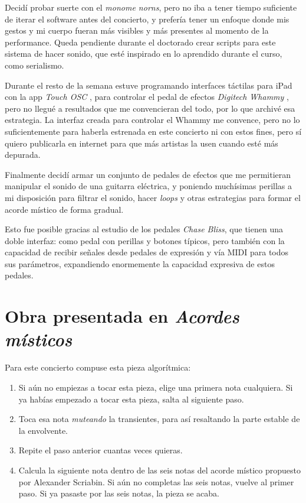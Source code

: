 \documentclass{article}
\begin{document}
Decidí probar suerte con el \textit{monome norns}, pero no iba a tener tiempo suficiente de iterar el software antes del concierto, y prefería tener un enfoque donde mis gestos y mi cuerpo fueran más visibles y más presentes al momento de la performance. Queda pendiente durante el doctorado crear scripts para este sistema de hacer sonido, que esté inspirado en lo aprendido durante el curso, como serialismo.

Durante el resto de la semana estuve programando interfaces táctilas para iPad con la app \textit{Touch OSC} \cite{hexlerTouchOSC}, para controlar el pedal de efectos \textit{Digitech Whammy} \cite{digitechWhammy}, pero no llegué a resultados que me convencieran del todo, por lo que archivé esa estrategia. La interfaz creada para controlar el Whammy me convence, pero no lo suficientemente para haberla estrenada en este concierto ni con estos fines, pero sí quiero publicarla en internet para que más artistas la usen cuando esté más depurada.

Finalmente decidí armar un conjunto de pedales de efectos que me permitieran manipular el sonido de una guitarra eléctrica, y poniendo muchísimas perillas a mi disposición para filtrar el sonido, hacer \textit{loops} y otras estrategias para formar el acorde místico de forma gradual.

Esto fue posible gracias al estudio de los pedales \textit{Chase Bliss}, que tienen una doble interfaz: como pedal con perillas y botones típicos, pero también con la capacidad de recibir señales desde pedales de expresión y vía MIDI para todos sus parámetros, expandiendo enormemente la capacidad expresiva de estos pedales.

\clearpage

\section{Obra presentada en \textit{Acordes místicos}}

Para este concierto compuse esta pieza algorítmica:

\begin{enumerate}
    \item Si aún no empiezas a tocar esta pieza, elige una primera nota cualquiera. Si ya habías empezado a tocar esta pieza, salta al siguiente paso.
    \item Toca esa nota \textit{muteando} la transientes, para así resaltando la parte estable de la envolvente.
    \item Repite el paso anterior cuantas veces quieras.
    \item Calcula la siguiente nota dentro de las seis notas del acorde místico propuesto por Alexander Scriabin. Si aún no completas las seis notas, vuelve al primer paso. Si ya pasaste por las seis notas, la pieza se acaba.
\end{enumerate}
\end{document}
